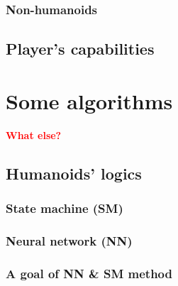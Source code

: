 \documentclass[12pt]{article}
\newcommand{\todo}[1]
{
    \marginpar
    {
        \textbf{\small{\textcolor{red}{#1}}}
    }
}
\begin{document}
			\subsubsection{Non-humanoids}
		\subsection{Player's capabilities}

	\section{Some algorithms}
		\todo{What else?}
		\subsection{Humanoids' logics}
			\subsubsection{State machine (SM)}
			\subsubsection{Neural network (NN)}
			\subsubsection{A goal of NN \& SM method}
\end{document}
